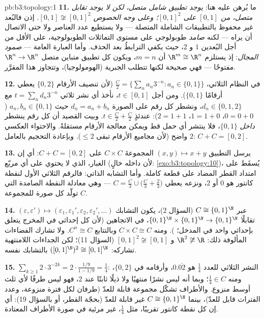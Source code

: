 \begin{solution}{pb:b3:topology:1}
\textbf{11.} ما بُرهن عليه هنا: \emph{يوجد تطبيق شامل متصل، لكن
لا يوجد تقابل متصل، من $[0,1]$ على $[0,1]^2$؛ وعلى وجه الخصوص
$[0,1] \not\cong [0,1]^2$.} إذن فالبُعد غير محفوظ بالتطبيقات الشاملة المتصلة
--- ولا يستطيع عدد العناصر ولا حتى الاتصال أن يراه --- لكنه
\emph{صامد} طوبولوجي على مستوى التماثلات الطوبولوجية، على الأقل
من أجل البُعدين $1$ و $2$، حيث يكفي الترابطُ بعد الحذف. وأما
العبارة العامة --- \emph{صمود المجال}: إذ يستلزم $\R^m \cong \R^n$ أن
$m =
n$، ويكون كل تطبيق متباين متصل $\R^n \to \R^n$ مفتوحًا ---
فهي صحيحة لكنها تتطلب  الجبرية (الهومولوجيا)،
وتتجاوز هذا المقرَّر.

\textbf{12.} في النظام الثلاثي، $\frac C2 = \{\sum_na_n3^{-n} : a_n
\in \{0, 1\}\}$ (لأن تنصيف الأرقام
$\{0,2\}$ يعطي أرقامًا $\{0,1\}$). ومن أجل $t \in [0,1]$، نأخذ
أي نشر ثلاثي $t =
\sum_nd_n3^{-n}$ مع $d_n \in \{0,1,2\}$، ونشطر كل رقم على الصورة
$d_n = a_n + b_n$ حيث $a_n, b_n \in \{0,1\}$ ($0 = 0{+}0$، $1 = 1{+}0$، $2 = 1{+}1$):
عندئذٍ $t \in \frac C2 + \frac C2$. وبيت القصيد أن كل رقم ينشطر \emph{داخل}
$\{0,1\}$، فلا ينتشر أي حمل قط ويمكن معالجة الأرقام مستقلةً.
والاحتواء العكسي واضح (لأن مجاميع الأرقام تبقى $\leq 2$).
وبإعادة التحجيم بالعامل $2$: $C + C = [0,2]$.

\textbf{13.} يرسل التطبيق $(x, y) \mapsto x + y$ المجموعةَ $C \times C$ على
$C + C = [0,2]$: أي إن الغبار، الذي لا يحتوي على أي مربّع
(لأن داخله خالٍ: \cref{exo:b3:topology:10})، يُسقَط على امتداد القطر المضاد
على قطعة كاملة. وأما التشابه الذاتي: فالرقم الثلاثي الأول
لنقطة كانتور هو $0$ أو $2$، ونزعه يعطي $C = \frac C3 \cup \bigl(\frac C3 +
\frac23\bigr)$ --- وهي معادلة
النقطة الصامدة التي تولّد كل صورة للمجموعة $C$.

\textbf{14.} عبر $C \cong \{0,1\}^\N$ (السؤال 2)، يكون التشابك $(\varepsilon, \varepsilon') \mapsto
(\varepsilon_1, \varepsilon_1', \varepsilon_2,
\varepsilon_2', \dots)$
تقابلًا $\{0,1\}^\N\times\{0,1\}^\N \to \{0,1\}^\N$،  في الاتجاهين (لأن كل إحداثي في المخرج
يتعلق بإحداثي واحد في المدخل؛ ). ومنه
$C\times C \cong C$ وبالتتابع $C^n \cong C$. ولا تشارك الفضاءات المألوفة
ذلك: $\R^2 \not\cong \R$ و $[0,1]^2 \not\cong [0,1]$ (السؤال 11)؛ لكن الجداءات اللامنتهية
تشاركه: $([0,1]^\N)^2 \cong
[0,1]^\N$ بالتشابك نفسه.

\textbf{15.} $\sum_{k\geq1}2\cdot3^{-2k} = 2\cdot\frac{1/9}{1
- 1/9} = \frac14$: النشر الثلاثي للعدد $\frac14$ هو $0.\overline{02}$،
وأرقامه في $\{0,2\}$، ومنه $\frac14 \in
C$؛ وبما أنه ليس نشرًا منتهيًا
ولا ذيلًا ثابتًا عند $2$، فهو ليس طرفًا لأي ثلث أوسط منزوع.
والأطراف تشكّل مجموعة قابلة للعدّ (طرفان لكل فترة منزوعة، وعدد
الفترات قابل للعدّ)، بينما $C \cong \{0,1\}^\N$ غير قابلة للعدّ (بحجّة القطر، أو
بالسؤال 19): أي إن كل نقطة كانتور تقريبًا، مثل $\frac14$، غير
مرئية في صورة الأطراف المعتادة.


\end{solution}
